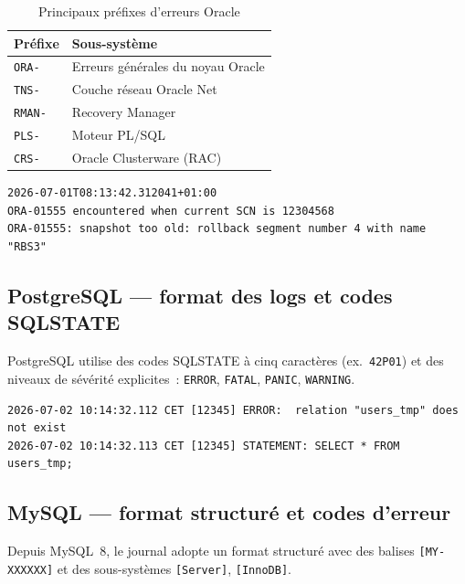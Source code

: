 \documentclass[12pt,a4paper]{report}
\begin{document}
\begin{table}[H]
  \centering
  \caption{Principaux pr\'efixes d'erreurs Oracle}
  \label{tab:prefixes_oracle}
  \begin{tabularx}{\textwidth}{lX}
    \toprule
    \textbf{Pr\'efixe} & \textbf{Sous-syst\`eme} \\
    \midrule
    \texttt{ORA-}  & Erreurs g\'en\'erales du noyau Oracle \\
    \texttt{TNS-}  & Couche r\'eseau Oracle Net \\
    \texttt{RMAN-} & Recovery Manager \\
    \texttt{PLS-}  & Moteur PL/SQL \\
    \texttt{CRS-}  & Oracle Clusterware (RAC) \\
    \bottomrule
  \end{tabularx}
\end{table}

\begin{lstlisting}[language={},caption={Extrait type d'un alert log Oracle},label=lst:alertlog_oracle]
2026-07-01T08:13:42.312041+01:00
ORA-01555 encountered when current SCN is 12304568
ORA-01555: snapshot too old: rollback segment number 4 with name "RBS3"
\end{lstlisting}

\subsection{PostgreSQL --- format des logs et codes SQLSTATE}

PostgreSQL utilise des codes SQLSTATE \`a cinq caract\`eres (ex.~\texttt{42P01})
et des niveaux de s\'ev\'erit\'e explicites~: \texttt{ERROR}, \texttt{FATAL},
\texttt{PANIC}, \texttt{WARNING}.

\begin{lstlisting}[language={},caption={Extrait type d'un log PostgreSQL},label=lst:alertlog_pg]
2026-07-02 10:14:32.112 CET [12345] ERROR:  relation "users_tmp" does not exist
2026-07-02 10:14:32.113 CET [12345] STATEMENT: SELECT * FROM users_tmp;
\end{lstlisting}

\subsection{MySQL --- format structur\'e et codes d'erreur}

Depuis MySQL~8, le journal adopte un format structur\'e avec des balises
\texttt{[MY-XXXXXX]} et des sous-syst\`emes \texttt{[Server]}, \texttt{[InnoDB]}.
\end{document}
